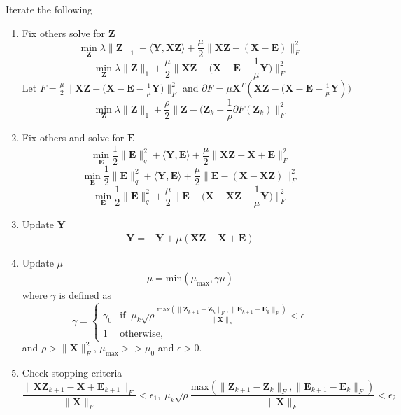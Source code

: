 \documentclass{article}
\begin{document}
Iterate the following
\begin{enumerate}
\item Fix others  solve for $\mathbf Z$
\[
\min_{\mathbf{Z}} \lambda\|\mathbf Z\|_{1} + \langle \mathbf{Y, XZ} \rangle + \frac{\mu}{2} \|\mathbf{XZ - (X - E) } \|_F^2 
\]
\[
\min_{\mathbf{Z}} \lambda\|\mathbf Z\|_{1} + \frac{\mu}{2} \|\mathbf{XZ - (X - E} - \frac{1}{\mu} \mathbf Y ) \|_F^2 
\]
Let $F = \frac{\mu}{2} \|\mathbf{XZ - (X - E} - \frac{1}{\mu} \mathbf Y ) \|_F^2$ and $\partial F =  \mu \mathbf X^T (\mathbf{XZ - (X - E} - \frac{1}{\mu} \mathbf Y ))$
\[
\min_{\mathbf{Z}} \lambda\|\mathbf Z\|_{1} + \frac{\rho}{2} \| \mathbf Z - (\mathbf Z_{k} - \frac{1}{\rho} \partial F(\mathbf Z_{k}) \|_F^2 
\]


\item Fix others and solve for $\mathbf E$
\[
\min_{\mathbf{E}} \frac12\|\mathbf E \|^2_q + \langle \mathbf{Y, E} \rangle + \frac{\mu}{2} \|\mathbf{XZ - X + E } \|_F^2 
\]
\[
\min_{\mathbf{E}} \frac12\|\mathbf E \|^2_q + \langle \mathbf{Y, E} \rangle + \frac{\mu}{2} \|\mathbf{E - (X - XZ)} \|_F^2 
\]
\[
\min_{\mathbf{E}} \frac12\|\mathbf E \|^2_q  + \frac{\mu}{2} \|\mathbf{E - (X - XZ} - \frac{1}{\mu} \mathbf Y) \|_F^2 
\]


\item Update $\mathbf Y$
\begin{align*}
\mathbf Y =& \mathbf Y + \mu (\mathbf{XZ - X + E})
\end{align*}

\item Update $\mu$
\begin{align*}
 \mu = \textrm{min}( \mu_{\text{max}}, \gamma \mu)
\end{align*}
where $\gamma$ is defined as
\[
\gamma = 
\begin{cases}
\gamma_0 & \text{if} \;\; \mu_k \sqrt{\rho} \frac{\textrm{max} (   \| \mathbf Z_{k+1} - \mathbf Z_{k}  \|_F  , \|  \mathbf E_{k+1} - \mathbf E_{k} \|_F)}{\| \mathbf X \|_F} < \epsilon \\
1 & \text{otherwise,}
\end{cases}
\]
and $\rho > \| \mathbf X \|_F^2$,  $\mu_{\text{max}} >>  \mu_0$ and $\epsilon > 0$.

\item Check stopping criteria
\[
\frac{\| \mathbf X \mathbf Z_{k+1} - \mathbf X + \mathbf E_{k+1}  \|_F}{ \| \mathbf X \|_F} < \epsilon_1, \;
 \mu_k \sqrt{\rho} \frac{\textrm{max} ( \| \mathbf Z_{k+1} - \mathbf Z_{k}  \|_F  , \|  \mathbf E_{k+1} - \mathbf E_{k} \|_F)}{\| \mathbf X \|_F} < \epsilon_2
\]

\end{enumerate}
\end{document}
